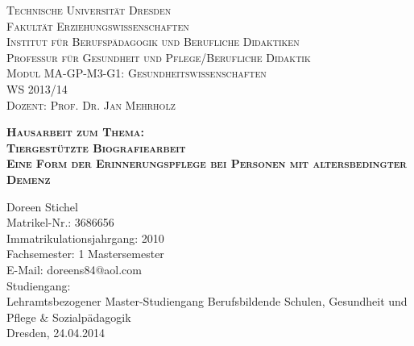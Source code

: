 \begin{titlepage}
\begin{flushleft}
\Large
\scshape
Technische Universität Dresden\\
\normalsize
\upshape
Fakultät Erziehungswissenschaften\\
Institut für Berufspädagogik und Berufliche Didaktiken\\
Professur für Gesundheit und Pflege/Berufliche Didaktik\\[0,5cm]
Modul MA-GP-M3-G1: Gesundheitswissenschaften\\[0,5cm]
WS 2013/14\\
Dozent: Prof. Dr. Jan Mehrholz\\
\end{flushleft}

\vfill

\begin{center}
\Huge
\scshape
\bfseries
Hausarbeit zum Thema:\\[1,0cm]
\Large
\mdseries
Tiergestützte Biografiearbeit\\[0,5cm]
Eine Form der Erinnerungspflege bei Personen mit altersbedingter Demenz\\
\end{center}

\vfill

\begin{flushleft}
Doreen Stichel\\
Matrikel-Nr.: 3686656\\
Immatrikulationsjahrgang: 2010\\
Fachsemester: 1 Mastersemester\\
E-Mail: doreens84@aol.com\\[0,5cm]
Studiengang:\\
Lehramtsbezogener Master-Studiengang Berufsbildende Schulen, Gesundheit und Pflege \& Sozialpädagogik\\[0,5cm]
Dresden, 24.04.2014
\end{flushleft}

\end{titlepage}